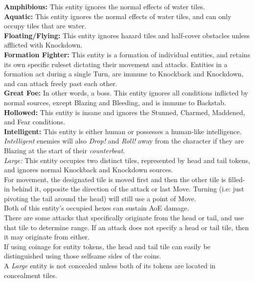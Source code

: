 \documentclass[12pt]{article}
\begin{document}
\begin{multicols*}{2}
\textbf{Amphibious:} This entity ignores the normal effects of water tiles.\\

\textbf{Aquatic:} This entity ignores the normal effects of water tiles, and can only occupy tiles that are water.\\

\textbf{Floating/Flying:} This entity ignores hazard tiles and half-cover obstacles unless afflicted with Knockdown.\\

\textbf{Formation Fighter:} This entity is a formation of individual entities, and retains its own specific ruleset dictating their movement and attacks. Entities in a formation act during a single Turn, are immune to Knockback and Knockdown, and can attack freely past each other.\\

\textbf{Great Foe:} In other words, a boss. This entity ignores all conditions inflicted by normal sources, except Blazing and Bleeding, and is immune to Backstab.\\

\textbf{Hollowed:} This entity is insane and ignores the Stunned, Charmed, Maddened, and Fear conditions.\\

\textbf{Intelligent:} This entity is either human or possesses a human-like intelligence. \emph{Intelligent} enemies will also \emph{Drop!} and \emph{Roll!} away from the character if they are Blazing at the start of their \emph{counterbeat.}\\

\emph{Large:} This entity occupies two distinct tiles, represented by head and tail tokens, and ignores normal Knockback and Knockdown sources.\\
For movement, the designated tile is moved first and then the other tile is filled-in behind it, opposite the direction of the attack or last Move. Turning (i.e: just pivoting the tail around the head) will still use a point of Move.\\
Both of this entity’s occupied hexes can sustain AoE damage.\\
There are some attacks that specifically originate from the head or tail, and use that tile to determine range. If an attack does not specify a head or tail tile, then it may originate from either.\\
If using coinage for entity tokens, the head and tail tile can easily be distinguished using those selfsame sides of the coins.\\
A \emph{Large} entity is not concealed unless both of its tokens are located in concealment tiles.\\


\end{multicols*}
\end{document}
